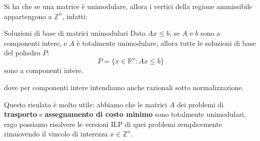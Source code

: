 \documentclass[a4paper,11pt]{article}
\begin{document}
Si ha che se una matrice è unimodulare, allora i vertici della regione ammissibile appartengono a $\mathbb{Z}^n$, infatti:
\begin{theorem}{Soluzioni di base di matrici unimodulari}
	Dato $Ax \leq b$, se $A$ e $b$ sono a componenti intere, e $A$ è totalmente unimodulare, allora tutte le soluzioni di base del poliedro $P$:
	$$
		P = \{ x \in \mathbb{R}^n : Ax \leq b \}
	$$
	sono a componenti intere.
\end{theorem}
dove per componenti intere intendiamo anche razionali sotto normalizzazione.
\par\smallskip
Questo risulato è molto utile: abbiamo che le matrici $A$ dei problemi di \textbf{trasporto} e \textbf{assegnamento di costo minimo} sono totalmente unimodulari, ergo possiamo risolvere le versioni ILP di quei problemi semplicemente rimuovendo il vincolo di interezza $x \in \mathbb{Z}^n$.
\end{document}
